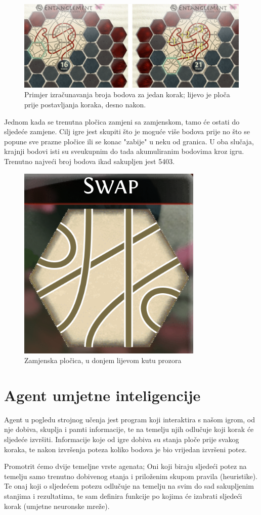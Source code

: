 \documentclass[zavrsnirad]{fer}
\begin{document}
\begin{figure}[htb]
	\centering
	\includegraphics[width=0.78\linewidth]{Figures/scoring.png} 
	\caption{Primjer izračunavanja broja bodova za jedan korak; lijevo je ploča prije postavljanja koraka, desno nakon.}
	\label{slk:scoring}
\end{figure}

Jednom kada se trenutna pločica zamjeni sa zamjenskom, tamo će ostati do sljedeće zamjene. Cilj igre jest skupiti što je moguće više bodova prije no što se popune sve prazne pločice ili se konac "zabije" u neku od granica. U oba slučaja, krajnji bodovi isti su sveukupnim do tada akumuliranim bodovima kroz igru. Trenutno najveći broj bodova ikad sakupljen jest 5403.

\begin{figure}[htb]
	\centering
	\includegraphics[width=0.2\linewidth]{Figures/zamjenska.png} 
	\caption{Zamjenska pločica, u donjem lijevom kutu prozora}
	\label{slk:swap_tile}
\end{figure}

\section{Agent umjetne inteligencije}
\label{pog:agent}
Agent u pogledu strojnog učenja jest program koji interaktira s našom igrom, od nje dobiva, skuplja i pamti informacije, te na temelju njih odlučuje koji korak će sljedeće izvršiti. Informacije koje od igre dobiva su stanja ploče prije svakog koraka, te nakon izvršenja poteza koliko bodova je bio vrijedan izvršeni potez.

Promotrit ćemo dvije temeljne vrste agenata; Oni koji biraju sljedeći potez na temelju samo trenutno dobivenog stanja i priloženim skupom pravila (heuristike). Te onaj koji o sljedećem potezu odlučuje na temelju na svim do sad sakupljenim stanjima i rezultatima, te sam definira funkcije po kojima će izabrati sljedeći korak (umjetne neuronske mreže). 
\end{document}

